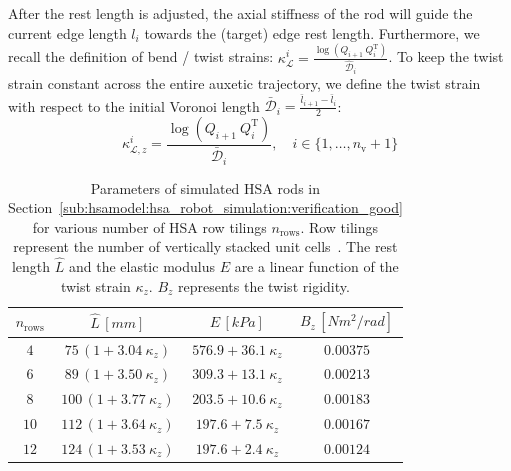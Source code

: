 After the rest length is adjusted, the axial stiffness of the rod will guide the current edge length $l_i$ towards the (target) edge rest length. %
Furthermore, we recall the definition of bend / twist strains: $\kappa_{\mathcal{L}}^i = \frac{\log(Q_{i+1} \: Q_i^\mathrm{T})}{\hat{\mathcal{D}}_i}$. 
To keep the twist strain constant across the entire auxetic trajectory, we define the twist strain with respect to the initial Voronoi length $\bar{\mathcal{D}}_i = \frac{\bar{l}_{i+1} - \bar{l}_i}{2}$:
\begin{equation}
    \kappa_{\mathcal{L},z}^i = \frac{\log(Q_{i+1} \: Q_i^\mathrm{T})}{\bar{\mathcal{D}}_i}, \quad i\in \{1,\dots,n_\mathrm{v}+1\}
\end{equation}

\begin{table}[hbt]
\centering
\caption{Parameters of simulated HSA rods in Section~\ref{sub:hsamodel:hsa_robot_simulation:verification_good} for various number of HSA row tilings $n_\mathrm{rows}$. Row tilings represent the number of vertically stacked unit cells~\cite{good2022expanding}. The rest length $\hat{L}$ and the elastic modulus $E$ are a linear function of the twist strain $\kappa_z$. $B_z$ represents the twist rigidity.}
\begin{tabular}{c ccc}\toprule
$n_\mathrm{rows}$ & $\hat{L} \, [\si{mm}]$ & $E \, [\si{kPa}]$ & $B_z \, [\si{Nm^2 \per rad}]$\\
\midrule
$4$ & $75 \, (1 + 3.04 \: \kappa_z)$ & $576.9 + 36.1 \: \kappa_z$ & $0.00375$\\
$6$ & $89 \, (1 + 3.50 \: \kappa_z)$ & $309.3 + 13.1 \: \kappa_z$ & $0.00213$\\
$8$ & $100 \, (1 + 3.77 \: \kappa_z)$ & $203.5 + 10.6 \: \kappa_z$ & $0.00183$\\
$10$ & $112 \, (1 + 3.64 \: \kappa_z)$ & $197.6 + 7.5 \: \kappa_z$ & $0.00167$\\
$12$ & $124 \, (1 + 3.53 \: \kappa_z)$ & $197.6 + 2.4 \: \kappa_z$ & $0.00124$\\
\bottomrule
\end{tabular}
\label{tab:hsamodel:hsa_rod_parameters_sim_verification}
\end{table}

